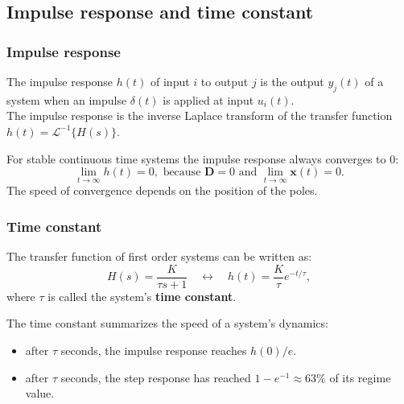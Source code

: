 \subsection{Impulse response and time constant}

\begin{frame}
\frametitle{Impulse response}
\begin{definition}
	The impulse response $h(t)$ of input $i$ to output $j$ is the output $y_j(t)$ of a system when an impulse $\delta(t)$ is applied at input $u_i(t)$.\\
The impulse response is the inverse Laplace transform of the transfer function $h(t) = \mathcal{L}^{-1}\{H(s)\}$.\\ 
\end{definition}
For stable continuous time systems the impulse response always converges to $0$:
\begin{equation*}
\lim_{t\rightarrow\infty} h(t) = 0, \text{ because } \mathbf{D}=0 \text{ and }\lim_{t\rightarrow\infty} \mathbf{x}(t) = 0.
\end{equation*}
The speed of convergence depends on the position of the poles.
\end{frame}

\begin{frame}
\frametitle{Time constant}
\begin{definition}
	The transfer function of first order systems can be written as:
	\begin{equation*}
	H(s) = \frac{K}{\tau s + 1}\quad \leftrightarrow \quad h(t) = \frac{K}{\tau} e^{-t/\tau},
	\end{equation*}
	where $\tau$ is called the system's \textbf{time constant}.\\
\end{definition}
\vspace{1em}
The time constant summarizes the speed of a system's dynamics:
\begin{itemize}
\item after $\tau$ seconds, the impulse response reaches $h(0)/e$.
\item after $\tau$ seconds, the step response has reached $1-e^{-1}\approx63\%$ of its regime value.
\end{itemize}
\end{frame}

